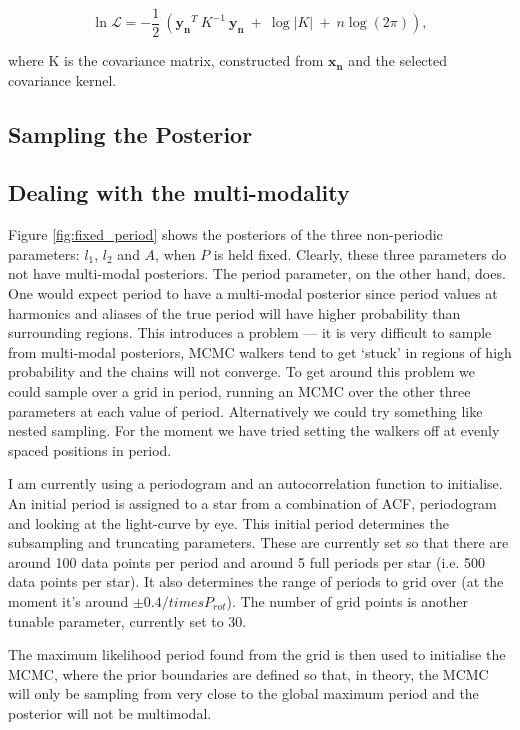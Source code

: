 \documentclass[10pt,preprint]{aastex}
\begin{document}
\begin{equation}
	\ln{\mathcal{L}} = -\frac{1}{2}~\left(\mathbf{y_n}^T~K^{-1}~\mathbf{y_n}~ + ~\log{|K| ~+~ n\log(2\pi)} \right),
\end{equation}

where K is the covariance matrix, constructed from $\mathbf{x_n}$ and the selected covariance kernel.

\subsection{Sampling the Posterior}

\subsection{Dealing with the multi-modality}

Figure \ref{fig:fixed_period} shows the posteriors of the three non-periodic parameters: $l_1$, $l_2$ and $A$, when $P$ is held fixed.
Clearly, these three parameters do not have multi-modal posteriors.
The period parameter, on the other hand, does.
One would expect period to have a multi-modal posterior since period values at harmonics and aliases of the true period will have higher probability than surrounding regions.
This introduces a problem --- it is very difficult to sample from multi-modal posteriors, MCMC walkers tend to get `stuck' in regions of high probability and the chains will not converge.
To get around this problem we could sample over a grid in period, running an MCMC over the other three parameters at each value of period.
Alternatively we could try something like nested sampling.
For the moment we have tried setting the walkers off at evenly spaced positions in period.

I am currently using a periodogram and an autocorrelation function to initialise.
An initial period is assigned to a star from a combination of ACF, periodogram and looking at the light-curve by eye.
This initial period determines the subsampling and truncating parameters.
These are currently set so that there are around 100 data points per period and around 5 full periods per star (i.e. 500 data points per star).
It also determines the range of periods to grid over (at the moment it's around $\pm 0.4 /times P_{rot}$).
The number of grid points is another tunable parameter, currently set to 30.

The maximum likelihood period found from the grid is then used to initialise the MCMC, where the prior boundaries are defined so that, in theory, the MCMC will only be sampling from very close to the global maximum period and the posterior will not be multimodal.
\end{document}
